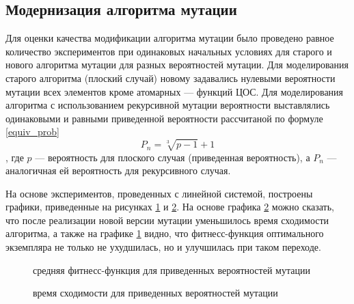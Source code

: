 \documentclass[utf8,usehyperref,14pt]{G7-32}
\begin{document}
\subsection{Модернизация алгоритма мутации}
Для оценки качества модификации алгоритма мутации было проведено равное количество экспериментов при одинаковых начальных условиях для старого и нового алгоритма мутации для разных вероятностей мутации. Для моделирования старого алгоритма (плоский случай) новому задавались нулевыми вероятности мутации всех элементов кроме атомарных --- функций ЦОС. Для моделирования алгоритма с использованием рекурсивной мутации вероятности выставлялись одинаковыми и равными приведенной вероятности рассчитаной по формуле \ref{equiv_prob}
\begin{equation}
P_{n}=\sqrt[3]{p-1}+1
\label{equiv_prob}
\end{equation}
, где $ p $ --- вероятность для плоского случая (приведенная вероятность), а $ P_{n} $ --- аналогичная ей вероятность для рекурсивного случая.

На основе экспериментов, проведенных с линейной системой, построены графики, приведенные на рисунках \ref{mutate_diff_fit} и \ref{mutate_diff_gen}. На основе графика  \ref{mutate_diff_gen} можно сказать, что после реализации новой версии мутации уменьшилось время сходимости алгоритма, а также на графике \ref{mutate_diff_fit} видно, что фитнесс-функция оптимального экземпляра не только не ухудшилась, но и улучшилась при таком переходе.
\begin{figure}[H]
 
  \caption{средняя фитнесс-функция для приведенных вероятностей мутации}\label{mutate_diff_fit}
\end{figure}
\begin{figure}[H]
 
  \caption{время сходимости для приведенных вероятностей мутации}\label{mutate_diff_gen}
\end{figure}
\end{document}
